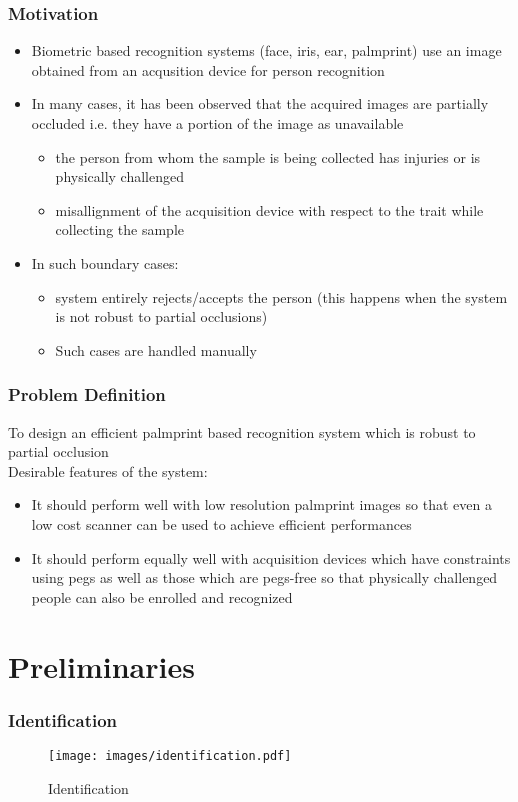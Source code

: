 \documentclass{beamer}
\begin{document}
\begin{frame}
\frametitle{Motivation}
\begin{itemize}
	\item Biometric based recognition systems (face, iris, ear, palmprint) use an image obtained from an acqusition device for person recognition
	\item In many cases, it has been observed that the acquired images are partially occluded i.e. they have a portion of the image as unavailable
	\begin{itemize}
	 \item the person from whom the sample is being collected has injuries or is physically challenged
	 \item    misallignment of the acquisition device with respect to the trait while collecting the sample
	\end{itemize}

	\item In such boundary cases:
	\begin{itemize}
	 \item system entirely rejects/accepts the person (this happens when the system is not robust to partial occlusions)
	 \item Such cases are handled manually
	\end{itemize}
\end{itemize}
\end{frame}


\begin{frame}
\frametitle{Problem Definition}
To design an efficient palmprint based recognition system which is robust to partial occlusion\\
Desirable features of the system:
 \begin{itemize}
 	\item It should perform well with low resolution palmprint images so that even a low cost scanner
can be used to achieve efficient performances
  	\item It should perform equally well with acquisition devices which have constraints using pegs as
well as those which are pegs-free so that physically challenged people can also be
enrolled and recognized
  \end{itemize}
\end{frame}

\section{Preliminaries}
\begin{frame}
\frametitle{Identification}
\begin{figure}[htp]
\begin{center}
\texttt{[image: images/identification.pdf]}
\caption{Identification\label{identification} }
\end{center}
\end{figure}
\end{frame}
\end{document}
